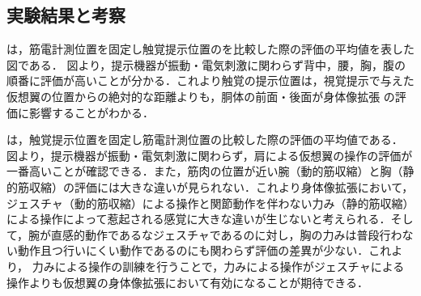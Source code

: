 \begin{small}
  \subsection{実験結果と考察}




        

        は，筋電計測位置を固定し触覚提示位置のを比較した際の評価の平均値を表した図である．
        図より，提示機器が振動・電気刺激に関わらず背中，腰，胸，腹の順番に評価が高いことが分かる．これより触覚の提示位置は，視覚提示で与えた仮想翼の位置からの絶対的な距離よりも，胴体の前面・後面が身体像拡張
        の評価に影響することがわかる．

        は，触覚提示位置を固定し筋電計測位置の比較した際の評価の平均値である．
        図より，提示機器が振動・電気刺激に関わらず，肩による仮想翼の操作の評価が一番高いことが確認できる．また，筋肉の位置が近い腕（動的筋収縮）と胸（静的筋収縮）の評価には大きな違いが見られない．これより身体像拡張において，ジェスチャ（動的筋収縮）による操作と関節動作を伴わない力み（静的筋収縮）による操作によって惹起される感覚に大きな違いが生じないと考えられる．そして，腕が直感的動作であるなジェスチャであるのに対し，胸の力みは普段行わない動作且つ行いにくい動作であるのにも関わらず評価の差異が少ない．これより，
        力みによる操作の訓練を行うことで，力みによる操作がジェスチャによる操作よりも仮想翼の身体像拡張において有効になることが期待できる．


\end{small}
